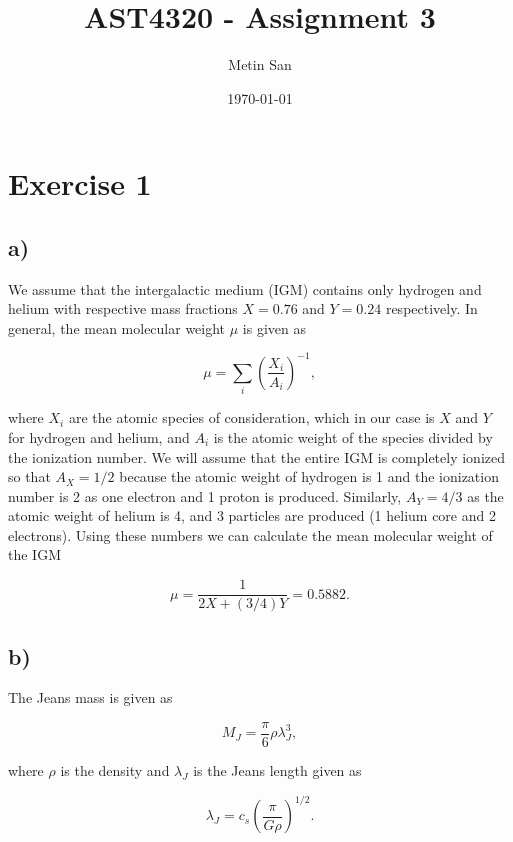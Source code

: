 \documentclass[a4paper]{article}
\title{AST4320 - Assignment 3}
\author{Metin San}
\date{\today}
\begin{document}
\maketitle

\section*{Exercise 1}
\subsection*{a)}
We assume that the intergalactic medium (IGM) contains only hydrogen and helium with
respective mass fractions $X = 0.76$ and $Y = 0.24$ respectively. In general, the mean
molecular weight $\mu$ is given as 

\begin{equation}\label{eq:mu}
    \mu = \sum_i \left ( \frac{X_i}{A_i} \right )^{-1},
\end{equation}

\noindent where $X_i$ are the atomic species of consideration, which in our case is $X$ and
$Y$ for hydrogen and helium, and $A_i$ is the atomic weight of the species divided by the
ionization number. We will assume that the entire IGM is completely ionized so that $A_X =
1/2$ because the atomic weight of hydrogen is 1 and the ionization number is 2 as one electron
and 1 proton is produced. Similarly, $A_Y = 4/3$ as the atomic weight of helium is 4, and 3
particles are produced (1 helium core and 2 electrons). Using these numbers we can calculate
the mean molecular weight of the IGM

\begin{equation}\label{eq:muIGM}
    \mu = \frac{1}{2X + (3/4)Y} = 0.5882.
\end{equation}

\subsection*{b)}
The Jeans mass is given as 

\begin{equation}\label{eq:jean}
    M_J = \frac{\pi}{6} \rho \lambda_J^3,
\end{equation}

\noindent where $\rho$ is the density and $\lambda_J$ is the Jeans length given as

\begin{equation}\label{eq:jeanlen}
    \lambda_J = c_s \left(\frac{\pi}{G \rho} \right)^{1/2}.
\end{equation}
\end{document}
